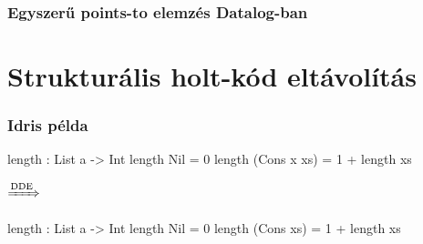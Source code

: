 \documentclass[bigger]{beamer}
\begin{document}
\begin{frame}
\frametitle{Egyszerű points-to elemzés Datalog-ban}
\end{frame}


\section{Strukturális holt-kód eltávolítás}

\begin{frame}[fragile]
	\frametitle{Idris példa}
	
	\begin{center}
		\begin{minipage}{0.40\textwidth}
			\begin{haskellcode}
            length : List a -> Int
            length Nil = 0
            length (Cons x xs) 
              = 1 + length xs
			\end{haskellcode}
		\end{minipage}
		$\xRightarrow{\text{DDE}}$
		\pause
		\begin{minipage}{0.40\textwidth}
			\begin{haskellcode}
			length : List a -> Int
			length Nil = 0
			length (Cons xs) 
			  = 1 + length xs
			\end{haskellcode}
		\end{minipage}
	\end{center}
	
\end{frame}
\end{document}

